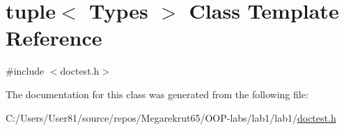 \hypertarget{classtuple}{}\section{tuple$<$ Types $>$ Class Template Reference}
\label{classtuple}


{\ttfamily \#include $<$doctest.\+h$>$}



The documentation for this class was generated from the following file\+:\begin{DoxyCompactItemize}
\item 
C\+:/\+Users/\+User81/source/repos/\+Megarekrut65/\+O\+O\+P-\/labs/lab1/lab1/\mbox{\hyperlink{doctest_8h}{doctest.\+h}}\end{DoxyCompactItemize}
